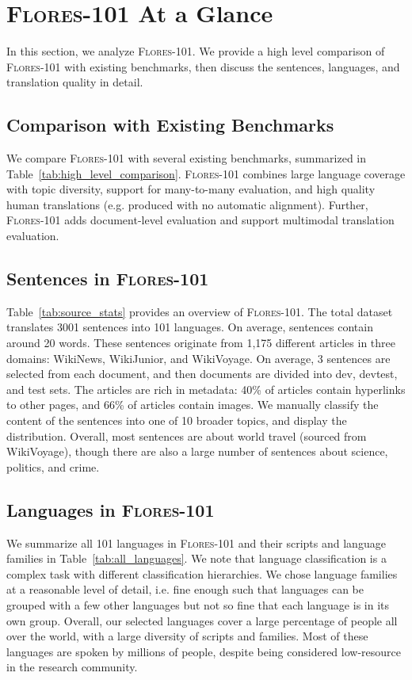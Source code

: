 \section{\textsc{Flores-101} At a Glance} \label{sec:atglance}

In this section, we analyze \textsc{Flores-101}. 
We provide a high level comparison of \textsc{Flores-101} with existing benchmarks, then discuss the sentences, languages, and translation quality in detail.

\subsection{Comparison with Existing Benchmarks} 

We compare \textsc{Flores-101} with several existing benchmarks, summarized in Table~\ref{tab:high_level_comparison}. 
\textsc{Flores-101} combines large language coverage with topic diversity, support for many-to-many evaluation, and high quality human translations (e.g. produced with no automatic alignment). Further, \textsc{Flores-101} adds document-level evaluation and support multimodal translation evaluation. 

\subsection{Sentences in \textsc{Flores-101}} 
Table~\ref{tab:source_stats} provides an overview of \textsc{Flores-101}. 
The total dataset translates 3001 sentences into 101 languages. On average, sentences contain around 20 words. These sentences originate from 1,175 different articles in three domains: WikiNews, WikiJunior, and WikiVoyage. On average, 3 sentences are selected from each document, and then documents are divided into dev, devtest, and test sets. The articles are rich in metadata: 40\% of articles contain hyperlinks to other pages, and 66\% of articles contain images. We manually classify the content of the sentences into one of 10 broader topics, and display the distribution. Overall, most sentences are about world travel (sourced from WikiVoyage), though there are also a large number of sentences about science, politics, and crime. 

\subsection{Languages in \textsc{Flores-101}} 

We summarize all 101 languages in \textsc{Flores-101} and their scripts and language families in Table~\ref{tab:all_languages}. 
We note that language classification is a complex task with different classification hierarchies. We chose language families at a reasonable level of detail, i.e. fine enough such that languages can be grouped with a few other languages but not so fine that each language is in its own group. Overall, our selected languages cover a large percentage of people all over the world, with a large diversity of scripts and families. Most of these languages are spoken by millions of people, despite being considered low-resource in the research community. 

